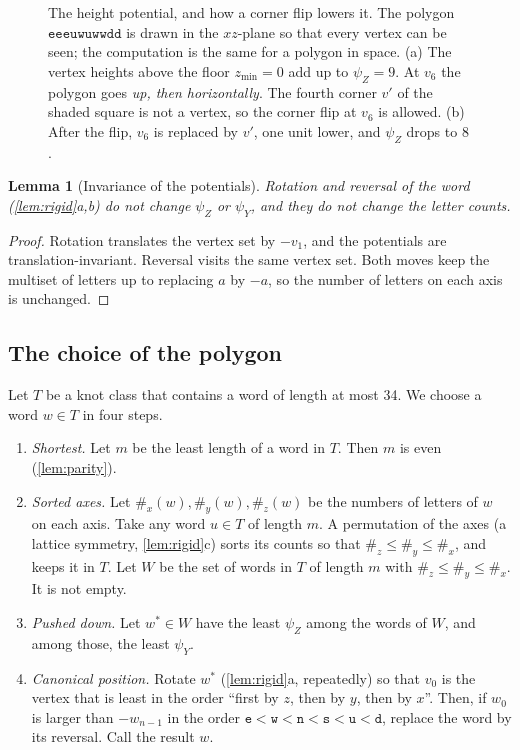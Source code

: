 \documentclass[11pt]{article}
\theoremstyle{plain}
\newtheorem{lemma}[theorem]{Lemma}
\theoremstyle{definition}
\theoremstyle{remark}
\newcommand{\word}[1]{\texttt{#1}}
\newcommand{\psiZ}{\psi_Z}
\newcommand{\psiY}{\psi_Y}
\begin{document}
\begin{figure}[t]
\centering
\FigPsi
\caption{The height potential, and how a corner flip lowers it. The polygon
$\word{eeeuwuwwdd}$ is drawn in the $xz$-plane so that every vertex can be seen; the computation is
the same for a polygon in space. (a) The vertex heights above the floor $z_{\min}=0$ add up to
$\psiZ=9$. At $v_6$ the polygon goes \emph{up, then horizontally}. The fourth corner $v'$ of the
shaded square is not a vertex, so the corner flip at $v_6$ is allowed. (b) After the flip, $v_6$ is
replaced by $v'$, one unit lower, and $\psiZ$ drops to $8$.}
\label{fig:psi}
\end{figure}

\begin{lemma}[Invariance of the potentials]\label{lem:psiinv}
Rotation and reversal of the word (\cref{lem:rigid}a,b) do not change $\psiZ$ or $\psiY$, and they do not
change the letter counts.
\end{lemma}
\begin{proof}
Rotation translates the vertex set by $-v_1$, and the potentials are translation-invariant. Reversal
visits the same vertex set. Both moves keep the multiset of letters up to replacing $a$ by $-a$, so the
number of letters on each axis is unchanged.
\end{proof}

\subsection{The choice of the polygon}\label{sec:choice}

Let $T$ be a knot class that contains a word of length at most
34. We choose a word $w\in T$ in four steps.

\begin{enumerate}[label=\textbf{Step \arabic*.},leftmargin=*]
\item \emph{Shortest.} Let $m$ be the least length of a word in $T$. Then $m$ is even
(\cref{lem:parity}).
\item \emph{Sorted axes.} Let $\#_x(w),\#_y(w),\#_z(w)$ be the numbers of letters of $w$ on each axis.
Take any word $u\in T$ of length $m$. A permutation of the axes (a lattice symmetry, \cref{lem:rigid}c)
sorts its counts so that $\#_z\le\#_y\le\#_x$, and keeps it in $T$. Let $W$ be the set of words in $T$
of length $m$ with $\#_z\le\#_y\le\#_x$. It is not empty.
\item \emph{Pushed down.} Let $w^*\in W$ have the least $\psiZ$ among the words of $W$, and among those,
the least $\psiY$.
\item \emph{Canonical position.} Rotate $w^*$ (\cref{lem:rigid}a, repeatedly) so that $v_0$ is the
vertex that is least in the order ``first by $z$, then by $y$, then by $x$''. Then, if $w_0$ is larger
than $-w_{n-1}$ in the order $\word{e}<\word{w}<\word{n}<\word{s}<\word{u}<\word{d}$, replace the word by
its reversal. Call the result $w$.
\end{enumerate}
\end{document}
